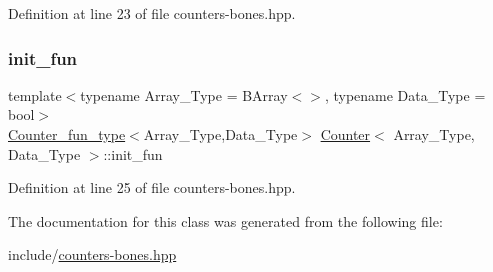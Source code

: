 Definition at line 23 of file counters-\/bones.\+hpp.

\mbox{\label{class_counter_abb4e0b67e6489d438918495651baa5a8}} 
\subsubsection{\texorpdfstring{init\+\_\+fun}{init\_fun}}
{\footnotesize\ttfamily template$<$typename Array\+\_\+\+Type = B\+Array$<$$>$, typename Data\+\_\+\+Type = bool$>$ \\
\hyperlink{typedefs_8hpp_ac0160f52f564dea3ac033b374cffbfe7}{Counter\+\_\+fun\+\_\+type}$<$Array\+\_\+\+Type,Data\+\_\+\+Type$>$ \hyperlink{class_counter}{Counter}$<$ Array\+\_\+\+Type, Data\+\_\+\+Type $>$\+::init\+\_\+fun}



Definition at line 25 of file counters-\/bones.\+hpp.



The documentation for this class was generated from the following file\+:\begin{DoxyCompactItemize}
\item 
include/\hyperlink{counters-bones_8hpp}{counters-\/bones.\+hpp}\end{DoxyCompactItemize}
